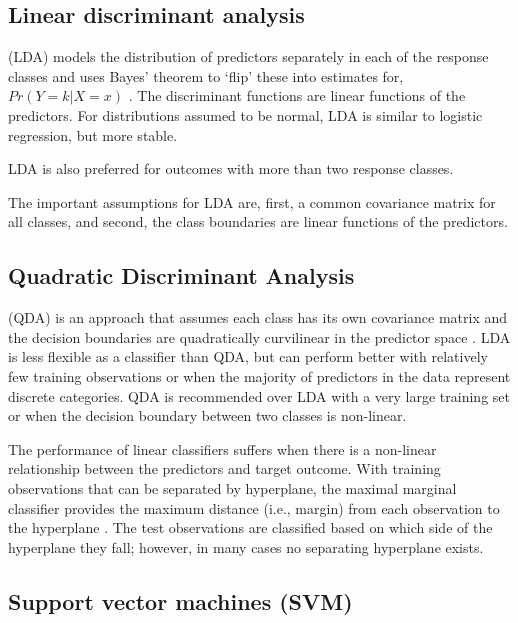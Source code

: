 
\subsection{Linear discriminant analysis} (LDA) models the distribution of predictors 
separately in each of the response classes and uses Bayes' theorem to `flip' 
these into estimates for, $Pr(Y=k | X=x)$ \cite{james13}. The discriminant 
functions are linear functions of the predictors. For distributions assumed to 
be normal, LDA is similar to logistic regression, but more stable. 

LDA is also preferred for outcomes with more than two response classes. 

The important assumptions for LDA are, first, a common covariance 
matrix for all classes, and second, the class boundaries are linear functions 
of the predictors. 

\subsection{Quadratic Discriminant Analysis} (QDA) is an approach 
that assumes each class has its own covariance matrix and the decision 
boundaries are quadratically curvilinear in the predictor space \cite{kuhn13}. 
LDA is less flexible as a classifier than QDA, but can perform better with 
relatively few training observations or when the majority of predictors in the 
data represent discrete categories. QDA is recommended over LDA with a very 
large training set or when the decision boundary between two classes is 
non-linear. 


The performance of linear classifiers suffers when there is a non-linear 
relationship between the predictors and target outcome. With training
observations that can be separated by hyperplane, the maximal marginal 
classifier provides the maximum distance (i.e., margin) from each observation
to the hyperplane \cite{james13}. The test observations are classified based 
on which side of the hyperplane they fall; however, in many cases no separating 
hyperplane exists. 




\subsection{Support vector machines (SVM)} 

